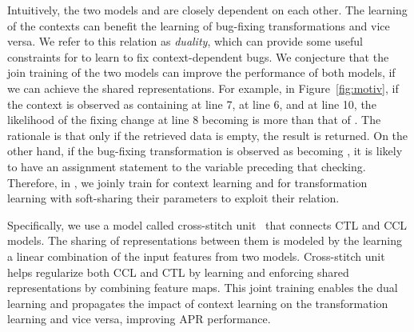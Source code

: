 Intuitively, the two models  and  are closely
dependent on each other. The learning of the contexts can benefit the
learning of bug-fixing transformations and vice versa. We refer to
this relation as {\em duality}, which can provide some useful
constraints for {\tool} to learn to fix context-dependent bugs. We
conjecture that the join training of the two models can improve the
performance of both models, if we can achieve the shared
representations.
For example, in Figure~\ref{fig:motiv}, if the context is observed as
containing  at line 7,  at line 6,
and  at line 10, the likelihood of the fixing
change at line 8 becoming  is more than that
of . The rationale is that only if the retrieved
data is empty, the result is returned. On the other hand, if the
bug-fixing transformation is observed as 
becoming , it is likely to have an assignment
statement to the variable  preceding that checking.
Therefore, in {\tool}, we joinly train  for context learning
and  for transformation learning with soft-sharing their
parameters to exploit their relation.

Specifically, we use a model called cross-stitch
unit~\cite{misra2016cross} that connects CTL and CCL models. The
sharing of representations between them is modeled by the
learning a linear combination of the input features from two
models. Cross-stitch unit helps regularize both CCL and CTL by
learning and enforcing shared representations by combining feature
maps. This joint training enables the dual learning and propagates the
impact of context learning on the transformation learning and vice
versa, improving APR performance.

